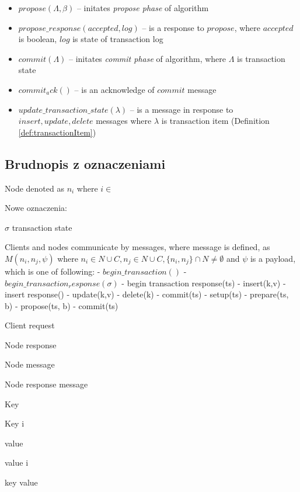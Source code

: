 \begin{definition}
\begin{itemize}
	\item $\mathit{propose}(\Lambda, \beta)$ -- initates \emph{propose phase} of \mpt algorithm
	\item $\mathit{propose\_response}(accepted, log)$ -- is a response to $\mathit{propose}$, where $\mathit{accepted}$ is boolean, $\mathit{log}$ is state of transaction log 
	\item $\mathit{commit}(\Lambda)$ -- initates \emph{commit phase} of \mpt algorithm, where $\Lambda$ is transaction state 
	\item $\mathit{commit_ack()}$ -- is an acknowledge of $\mathit{commit}$ message 
	\item $\mathit{update\_transaction\_state}(\lambda)$ -- is a message in response to $\mathit{insert, update, delete}$ messages where $\lambda$ is transaction item (Definition \ref{def:transactionItem}) 
	\end{itemize}
\end{definition}


\subsection{Brudnopis z oznaczeniami}

Node denoted as $n_i$ where $i \in $


Nowe oznaczenia:

$\sigma$ transaction state

Clients and nodes communicate by messages, where message is defined, as $\mathit{M}(n_{i}, n_{j}, \psi)$ where 
$n_{i}\in\mathit{N}\cup\mathit{C}, n_{j}\in\mathit{N}\cup\mathit{C},\{n_{i}, n_{j}\}\cap\mathit{N}\neq\emptyset$ and $\psi$ is a payload, which is one of following:
- $\mathit{begin\_transaction}()$
- $\mathit{begin\_transaction_response}(\sigma)$
- begin transaction response(ts)
- insert(k,v)
- insert response()
- update(k,v)
- delete(k)
- commit(ts)
- setup(ts)
- prepare(ts, b)
- propose(ts, b)
- commit(ts)


Client request 

Node response 

Node message 

Node response message 

Key \key

Key i 

value \kvalue

value i 

key value \kv

